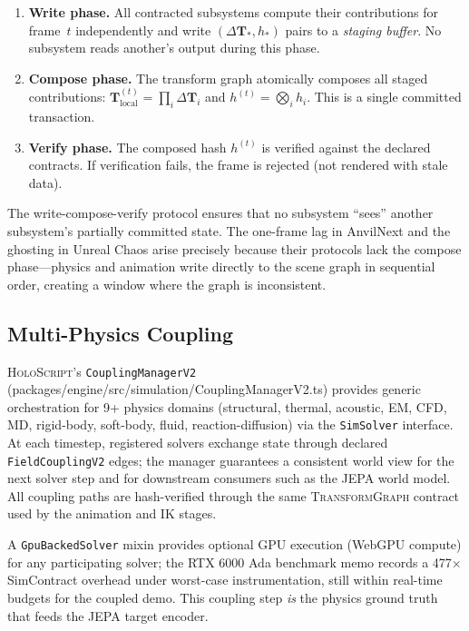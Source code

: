 \documentclass[sigconf,nonacm]{acmart}
\newcommand{\holoscript}{\textsc{HoloScript}}
\newcommand{\transformgraph}{\textsc{TransformGraph}}
\begin{document}
\begin{enumerate}
  \item \textbf{Write phase.} All contracted subsystems compute
    their contributions for frame~$t$ independently and write
    $(\Delta\mathbf{T}_*, h_*)$ pairs to a \emph{staging buffer}.
    No subsystem reads another's output during this phase.
  \item \textbf{Compose phase.} The transform graph atomically
    composes all staged contributions:
    $\mathbf{T}_{\text{local}}^{(t)} = \prod_i \Delta\mathbf{T}_i$
    and $h^{(t)} = \bigotimes_i h_i$. This is a single committed
    transaction.
  \item \textbf{Verify phase.} The composed hash $h^{(t)}$ is
    verified against the declared contracts. If verification
    fails, the frame is rejected (not rendered with stale data).
\end{enumerate}

The write-compose-verify protocol ensures that no subsystem
``sees'' another subsystem's partially committed state. The
one-frame lag in AnvilNext and the ghosting in Unreal Chaos
arise precisely because their protocols lack the compose
phase---physics and animation write directly to the scene graph
in sequential order, creating a window where the graph is
inconsistent.

\subsection{Multi-Physics Coupling}
\label{sec:coupling}

\holoscript{}'s \texttt{CouplingManagerV2}
(packages/engine/src/simulation/CouplingManagerV2.ts) provides
generic orchestration for 9+ physics domains (structural, thermal,
acoustic, EM, CFD, MD, rigid-body, soft-body, fluid,
reaction-diffusion) via the \texttt{SimSolver} interface. At each
timestep, registered solvers exchange state through declared
\texttt{FieldCouplingV2} edges; the manager guarantees a consistent
world view for the next solver step and for downstream consumers
such as the JEPA world model. All coupling paths are hash-verified
through the same \transformgraph{} contract used by the animation
and IK stages.

A \texttt{GpuBackedSolver} mixin provides optional GPU execution
(WebGPU compute) for any participating solver; the RTX 6000 Ada
benchmark memo records a 477$\times$ SimContract overhead under
worst-case instrumentation, still within real-time budgets for the
coupled demo. This coupling step \emph{is} the physics ground truth
that feeds the JEPA target encoder.
\end{document}
